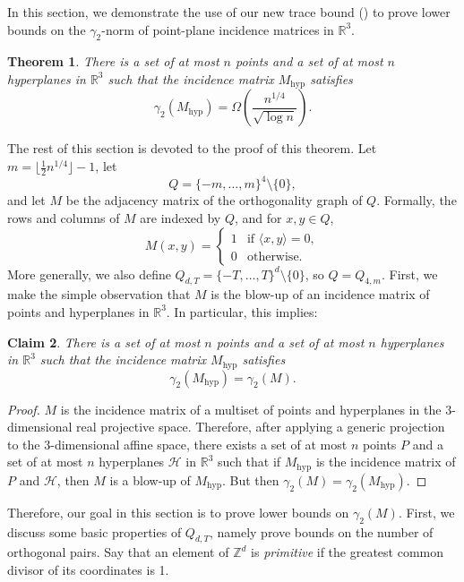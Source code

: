 \documentclass[11pt]{article}
\theoremstyle{plain}
\newtheorem{theorem}{Theorem}[section]
\newtheorem{claim}[theorem]{Claim}
\theoremstyle{definition}
\begin{document}
	In this section, we demonstrate the use of our new trace bound () to prove lower bounds on the $\gamma_2$-norm of point-plane incidence matrices in $\mathbb{R}^3$. 
	
	\begin{theorem}\label{thm:3dim}
		There is a set of at most $n$ points and a set of at most $n$ hyperplanes in $\mathbb{R}^3$ such that the incidence matrix $M_{\text{hyp}}$ satisfies
		$$\gamma_2(M_{\text{hyp}})=\Omega\left(\frac{n^{1/4}}{\sqrt{\log n}}\right).$$
	\end{theorem}
	
	\noindent
	The rest of this section is devoted to the proof of this theorem. Let $m=\lfloor \frac{1}{2}n^{1/4}\rfloor-1$, let 
	$$Q=\{-m,\dots,m\}^4\setminus \{0\},$$ and let $M$ be the adjacency matrix of the orthogonality graph of $Q$. Formally, the rows and columns of $M$ are indexed by $Q$, and for $x,y\in Q$,
	$$M(x,y)=\begin{cases} 1&\text{if }\langle x,y\rangle=0,\\
		0&\text{otherwise}.\end{cases}$$
	More generally, we also define $Q_{d,T}=\{-T,\dots,T\}^d\setminus \{0\}$, so $Q=Q_{4,m}$.
	First, we make the simple observation that $M$ is the blow-up of an incidence matrix of points and hyperplanes in $\mathbb{R}^3$. In particular, this implies:
	
	\begin{claim}
		There is a set of at most $n$ points and a set of at most $n$ hyperplanes in $\mathbb{R}^3$ such that the incidence matrix $M_{\text{hyp}}$ satisfies
		$$\gamma_2(M_{\text{hyp}})=\gamma_2(M).$$
	\end{claim}
	
	\begin{proof}
		$M$ is the incidence matrix of a multiset of points and hyperplanes in the $3$-dimensional real projective space. Therefore, after applying a generic projection to the 3-dimensional affine space, there exists a set of at most $n$ points $P$ and a set of at most $n$ hyperplanes $\mathcal{H}$ in $\mathbb{R}^3$ such that if $M_{\text{hyp}}$ is the incidence matrix of $P$ and $\mathcal{H}$, then $M$ is a blow-up of $M_{\text{hyp}}$. But then $\gamma_2(M)=\gamma_2(M_{\text{hyp}})$.
	\end{proof}
	
	
	Therefore, our goal in this section is to prove lower bounds on $\gamma_2(M)$. First, we discuss some basic properties of $Q_{d,T}$, namely prove bounds on the number of orthogonal pairs. Say that an element of $\mathbb{Z}^d$ is \emph{primitive} if the greatest common divisor of its coordinates is 1.  
	
\end{document}
